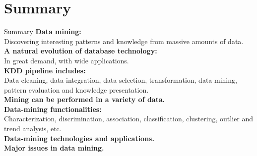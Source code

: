 \section{Summary}

\begin{frame}{Summary}
	\textbf{Data mining:}\\
	Discovering interesting patterns and knowledge from massive amounts of
	data.\\[0.2cm]

	\textbf{A natural evolution of database technology:}\\
	In great demand, with wide applications.\\[0.2cm]

	\textbf{KDD pipeline includes:}\\
	Data cleaning, data integration, data selection, transformation, data
	mining, pattern evaluation and knowledge presentation.\\[0.2cm]

	\textbf{Mining can be performed in a variety of data.}\\
	\textbf{Data-mining functionalities:}\\
	Characterization, discrimination, association, classification, clustering,
	outlier and trend analysis, etc.\\[0.2cm]

	\textbf{Data-mining technologies and applications.}\\
	\textbf{Major issues in data mining.}\\
\end{frame}
